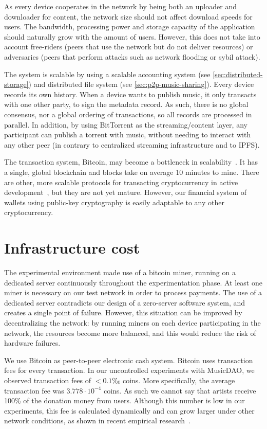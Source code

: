 As every device cooperates in the network by being both an uploader and downloader for content, the network size should not affect download speeds for users. The bandwidth, processing power and storage capacity of the application should naturally grow with the amount of users. However, this does not take into account free-riders (peers that use the network but do not deliver resources) or adversaries (peers that perform attacks such as network flooding or sybil attack).

The system is scalable by using a scalable accounting system (see \ref{sec:distributed-storage}) and distributed file system (see \ref{sec:p2p-music-sharing}). Every device records its own history. When a device wants to publish music, it only transacts with one other party, to sign the metadata record. As such, there is no global consensus, nor a global ordering of transactions, so all records are processed in parallel. In addition, by using BitTorrent as the streaming/content layer, any participant can publish a torrent with music, without needing to interact with any other peer (in contrary to centralized streaming infrastructure and to IPFS). 

The transaction system, Bitcoin, may become a bottleneck in scalability~\citep{chauhan2018blockchain}. It has a single, global blockchain and blocks take on average 10 minutes to mine. There are other, more scalable protocols for transacting cryptocurrency in active development~\citep{lemahieu2018nano}, but they are not yet mature. However, our financial system of wallets using public-key cryptography is easily adaptable to any other cryptocurrency.

\section{Infrastructure cost}
The experimental environment made use of a bitcoin miner, running on a dedicated server continuously throughout the experimentation phase. At least one miner is necessary on our test network in order to process payments. The use of a dedicated server contradicts our design of a zero-server software system, and creates a single point of failure. However, this situation can be improved by decentralizing the network: by running miners on each device participating in the network, the resources become more balanced, and this would reduce the risk of hardware failures.

We use Bitcoin as peer-to-peer electronic cash system. Bitcoin uses transaction fees for every transaction. In our uncontrolled experiments with MusicDAO, we observed transaction fees of $<0.1‰$ coins. More specifically, the average transaction fee was $3.778\cdot10^{-4}$ coins. As such we cannot say that artists receive 100\% of the donation money from users. Although this number is low in our experiments, this fee is calculated dynamically and can grow larger under other network conditions, as shown in recent empirical research~\citep{moser2015trends}. 


